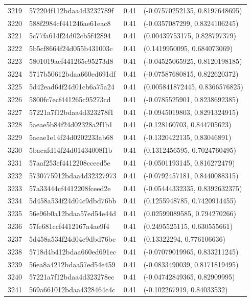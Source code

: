 \begin{table}[ht]
\begin{tabular}{rlrl}
  3219 & 572204f112bdaa4d3232789f & 0.41 & (-0.07570252135, 0.8197648695) \\ 
  3220 & 588f2984cf441246ae61eac8 & 0.41 & (-0.0357087299, 0.8324106245) \\ 
  3221 & 5c77fa614f24d02cb5f42894 & 0.41 & (0.00439753175, 0.828797379) \\ 
  3222 & 5b5cf8664f24d055b431003c & 0.41 & (0.1419950095, 0.684073069) \\ 
  3223 & 5801019acf441265c95273d8 & 0.41 & (-0.04525065925, 0.8120198185) \\ 
  3224 & 5717b50612bdaa660ed691df & 0.41 & (-0.07587680815, 0.822620372) \\ 
  3225 & 5d42ead64f24d01cb6a75a24 & 0.41 & (0.005841872445, 0.8366576825) \\ 
  3226 & 5800fc7ecf441265c95273cd & 0.41 & (-0.0785525901, 0.8238692385) \\ 
  3227 & 57221a7f12bdaa4d323278f1 & 0.41 & (-0.0945019803, 0.8291324915) \\ 
  3228 & 5aeae5b84f24d02328a2f1b1 & 0.41 & (-0.128160703, 0.844705623) \\ 
  3229 & 5aeae1e14f24d0202233ab68 & 0.41 & (-0.1320422135, 0.83046891) \\ 
  3230 & 5bacafd14f24d01434008f1b & 0.41 & (0.1312456595, 0.7024760495) \\ 
  3231 & 57aaf253cf4412208cceed5e & 0.41 & (-0.0501193145, 0.816272479) \\ 
  3232 & 5730775912bdaa4d32327973 & 0.41 & (-0.0792457181, 0.8440088315) \\ 
  3233 & 57a33444cf4412208fceed2e & 0.41 & (-0.05444332335, 0.8392632375) \\ 
  3234 & 5d458a534f24d04c9dbd76bb & 0.41 & (0.1255948785, 0.7420914455) \\ 
  3235 & 56e96b0a12bdaa57ed54e44d & 0.41 & (0.02599089585, 0.794270266) \\ 
  3236 & 57fe681ccf4412167a4ae9f4 & 0.41 & (0.2495525115, 0.630555661) \\ 
  3237 & 5d458a534f24d04c9dbd76bc & 0.41 & (0.13322294, 0.776106636) \\ 
  3238 & 5718d4b412bdaa660ed691ec & 0.41 & (-0.07079019965, 0.833211245) \\ 
  3239 & 56ea8a4212bdaa57ed54e459 & 0.41 & (-0.0833490039, 0.8171819495) \\ 
  3240 & 57221a7f12bdaa4d323278ec & 0.41 & (-0.04742849365, 0.82909995) \\ 
  3241 & 569a661012bdaa4328464c4c & 0.41 & (-0.102267919, 0.84033532) \\ 

\end{tabular}
\end{table}
